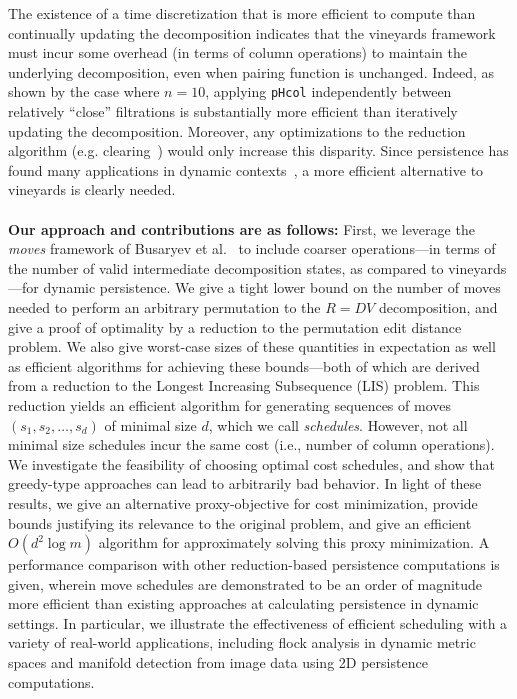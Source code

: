 \documentclass[sn-mathphys]{sn-jnl}
\begin{document}
  The existence of a time discretization that is more efficient to compute than continually updating the decomposition indicates that the vineyards framework must incur some overhead (in terms of column operations) to maintain the underlying decomposition, even when pairing function is unchanged. 
Indeed, as shown by the case where $n = 10$, applying \texttt{pHcol} independently between  relatively ``close'' filtrations is substantially more efficient than iteratively updating the decomposition.
 Moreover, any optimizations to the reduction algorithm (e.g. clearing~\cite{chen2011persistent}) would only increase this disparity.
Since persistence has found many applications in dynamic contexts~\cite{topaz2015topological, xian2020capturing, lesnick2015interactive, kim2020spatiotemporal}, a more efficient alternative to vineyards is clearly needed. 
 \\
 \\
 \noindent
\textbf{Our approach and contributions are as follows:} First, we leverage the \emph{moves} framework of Busaryev et al.~\cite{busaryev2010tracking} to include  coarser  operations---in terms of the number of valid intermediate decomposition states, as compared to vineyards---for dynamic persistence. 
We give a tight lower bound on the number of moves needed to perform an arbitrary permutation to the $R = D V$ decomposition, and give a proof of optimality by a reduction to the permutation edit distance problem.
We also give worst-case sizes of these quantities in expectation as well as efficient algorithms for achieving these bounds---both of which are derived from a reduction to the Longest Increasing Subsequence (LIS) problem. 
This reduction yields an efficient algorithm for generating sequences of moves $( s_1, s_2, \dots, s_d )$ of minimal size $d$, which we call \emph{schedules}. 
However, not all minimal size schedules incur the same  cost 
(i.e., number of column operations).
We investigate the feasibility of choosing optimal cost schedules, and show that 
greedy-type approaches can lead to arbitrarily bad behavior. 
In light of these results, we give an alternative proxy-objective for cost minimization, provide bounds justifying its relevance to the original problem, and give an efficient $O(d^2 \log m)$ algorithm for approximately solving this proxy minimization. 
A performance comparison with other reduction-based persistence computations is given, wherein move schedules are demonstrated to be an order of magnitude more efficient than existing approaches at calculating persistence in dynamic settings. In particular, we illustrate the effectiveness of efficient scheduling with a variety of real-world applications, including flock analysis in dynamic metric spaces and manifold detection from image data using 2D persistence computations. 
  
\end{document}
